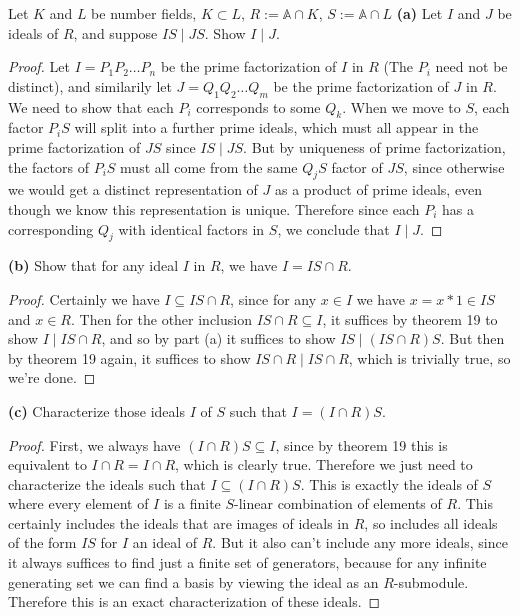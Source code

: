 \documentclass[11pt]{article}
\begin{document}
Let $K$ and $L$ be number fields, $K \subset L$, $R := \mathbb{A} \cap K$, $S := \mathbb{A} \cap L$
\textbf{(a)} Let $I$ and $J$ be ideals of $R$, and suppose $IS \mid JS$. Show $I \mid J$.

\begin{proof}
  Let $I = P_1P_2 \dots P_n$ be the prime factorization of $I$ in $R$ (The $P_i$ need not be distinct), and similarily let $J = Q_1Q_2 \dots Q_m$ be the prime factorization of $J$ in $R$.
  We need to show that each $P_i$ corresponds to some $Q_k$.
  When we move to $S$, each factor $P_iS$ will split into a further prime ideals, which must all appear in the prime factorization of $JS$ since $IS \mid JS$.
  But by uniqueness of prime factorization, the factors of $P_iS$ must all come from the same $Q_jS$ factor of $JS$, since otherwise we would get a distinct representation of $J$ as a product of prime ideals, even though we know this representation is unique.
  Therefore since each $P_i$ has a corresponding $Q_j$ with identical factors in $S$, we conclude that $I \mid J$.  
\end{proof}

\textbf{(b)} Show that for any ideal $I$ in $R$, we have $I = IS \cap R$.

\begin{proof}
  Certainly we have $I \subseteq IS \cap R$, since for any $x \in I$ we have $x = x*1 \in IS$ and $x \in R$.
  Then for the other inclusion $IS \cap R \subseteq I$, it suffices by theorem 19 to show $I \mid IS \cap R$, and so by part (a) it suffices to show $IS \mid (IS \cap R)S$.
  But then by theorem 19 again, it suffices to show $IS \cap R \mid IS \cap R$, which is trivially true, so we're done.
\end{proof}

\textbf{(c)} Characterize those ideals $I$ of $S$ such that $I = (I \cap R)S$.

\begin{proof}
  First, we always have $(I \cap R)S \subseteq I$, since by theorem 19 this is equivalent to $I \cap R = I \cap R$, which is clearly true.
  Therefore we just need to characterize the ideals such that $I \subseteq (I \cap R)S$.
  This is exactly the ideals of $S$ where every element of $I$ is a finite $S$-linear combination of elements of $R$.
  This certainly includes the ideals that are images of ideals in $R$, so includes all ideals of the form $IS$ for $I$ an ideal of $R$.
  But it also can't include any more ideals, since it always suffices to find just a finite set of generators, because for any infinite generating set we can find a basis by viewing the ideal as an $R$-submodule.
  Therefore this is an exact characterization of these ideals.
\end{proof}
\end{document}
